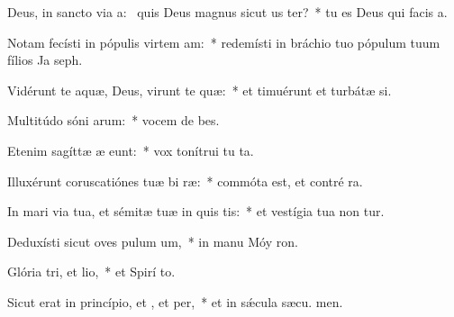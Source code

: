 \item Deus, in sancto via a:~\pscross{} quis Deus magnus sicut us ter?~* tu es Deus qui facis a.
\item Notam fecísti in pópulis virtem am:~* redemísti in bráchio tuo pópulum tuum fílios Ja  seph.
\item Vidérunt te aquæ, Deus, virunt te quæ:~* et timuérunt et turbátæ  si.
\item Multitúdo sóni arum:~* vocem de bes.
\item Etenim sagíttæ æ eunt:~* vox tonítrui tu  ta.
\item Illuxérunt coruscatiónes tuæ bi ræ:~* commóta est, et contré ra.
\item In mari via tua, et sémitæ tuæ in quis tis:~* et vestígia tua non tur.
\item Deduxísti sicut oves pulum um,~* in manu Móy  ron.
\item Glória tri, et lio,~* et Spirí to.
\item Sicut erat in princípio, et , et per,~* et in sǽcula sæcu. men.
